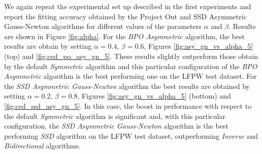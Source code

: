 We again repeat the experimental set up described in the first experiments and report the fitting accuracy obtained by the Project Out and SSD Asymmetric Gauss-Newton algorithms for different values of the parameters $\alpha$ and $\beta$. Results are shown in Figure \ref{fig:alpha}. For the \emph{BPO Asymmetric} algorithm, the best results are obtain by setting $\alpha=0.4$, $\beta=0.6$, Figures \ref{fig:asy_gn_vs_alpha_5} (top) and \ref{fig:ced_po_asy_gn_5}. These results slightly outperform those obtain by the default \emph{Symmetric} algorithm and this particular configuration of the \emph{BPO Asymmetric} algorithm is the best performing one on the LFPW test dataset. For the \emph{SSD Asymmetric Gauss-Newton} algorithm the best results are obtained by setting $\alpha=0.2$, $\beta=0.8$, Figures \ref{fig:asy_gn_vs_alpha_5} (bottom) and \ref{fig:ced_ssd_asy_gn_5}. In this case, the boost in performance with respect to the default \emph{Symmetric} algorithm is significant and, with this particular configuration, the \emph{SSD Asymmetric Gauss-Newton} algorithm is the best performing \emph{SSD} algorithm on the LFPW test dataset, outperforming \emph{Inverse} and \emph{Bidirectional} algorithms.


